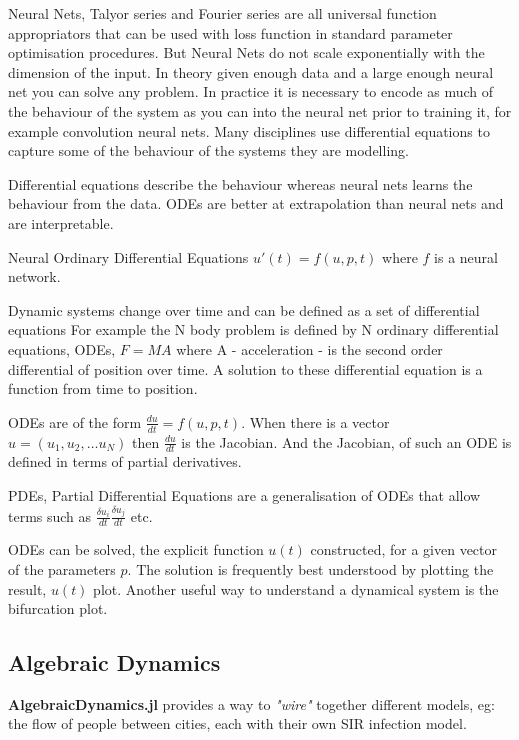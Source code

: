 Neural Nets, Talyor series and Fourier series are all universal function appropriators that can be used with loss function in standard parameter optimisation procedures. But Neural Nets  do not scale exponentially with the dimension of the input. In theory given enough data and a large enough neural net you can solve any problem. In practice it is necessary to encode as much of the behaviour of the system as you can into the neural net prior to training it, for example convolution neural nets. Many disciplines use differential equations to capture some of the behaviour of the systems they are modelling.

Differential equations describe the behaviour whereas neural nets learns the behaviour from the data. ODEs are better at extrapolation than neural nets and are interpretable.

Neural Ordinary Differential Equations  $u'(t) = f(u,p,t)$  where $f$ is a neural network.




Dynamic systems change over time and can be defined as a set of differential equations For example the N body problem is defined by N ordinary differential equations, ODEs, $F=MA$ where A - acceleration - is the second order differential of position over time. A solution to these differential equation is a function from time to position.

ODEs  are of the form $\frac{du}{dt} = f(u,p,t)$. When there is a vector  $u=(u_1,u_2,\ldots u_N)$ then $\frac{du}{dt}$ is the Jacobian. And the Jacobian, of such an ODE is defined in terms of partial derivatives. 

PDEs, Partial Differential Equations are a generalisation of ODEs that allow terms such as $\frac{\delta u_i}{dt}\frac{\delta u_j}{dt}$ etc.

ODEs can be solved, the explicit function $u(t)$ constructed, for a given vector of the parameters $p$. The solution is frequently best understood by plotting the result, $u(t)$ plot.  Another useful way to understand a dynamical system  is the bifurcation plot.

\subsection{Algebraic Dynamics}

{\bf AlgebraicDynamics.jl} provides a way to \emph{"wire"} together different models, eg: the flow of people between cities, each with their own SIR infection model.

